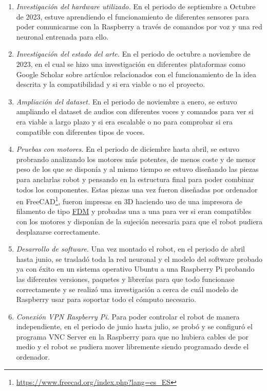 \begin{enumerate}
 \item \textit{Investigación del hardware utilizado.} En el periodo de septiembre a Octubre de 2023, estuve aprendiendo el funcionamiento de diferentes sensores para poder comunicarme con la Raspberry a través de comandos por voz y una red neuronal entrenada para ello.

 \item \textit{Investigación del estado del arte.} En el periodo de octubre a noviembre de 2023, en el cual se hizo una investigación en diferentes plataformas como Google Scholar sobre artículos relacionados con el funcionamiento de la idea descrita y la compatibilidad y si era viable o no el proyecto.
 
  \item \textit{Ampliación del dataset.} En el periodo de noviembre a enero, se estuvo ampliando el dataset de audios con diferentes voces y comandos para ver si era viable a largo plazo y si era escalable o no para comprobar si era compatible con diferentes tipos de voces.
  
  \item \textit{Pruebas con motores.} En el periodo de diciembre hasta abril, se estuvo probrando analizando los motores más potentes, de menos coste y de menor peso de los que se disponía y al mismo tiempo se estuvo diseñando las piezas para anclarlas robot y pensando en la estructura final para poder combinar todos los componentes. Estas piezas una vez fueron diseñadas por ordenador en FreeCAD\footnote{\url{https://www.freecad.org/index.php?lang=es_ES}}, fueron impresas en 3D haciendo uso de una impresora de filamento de tipo \hyperlink{FDM}{FDM} y probadas una a una para ver si eran compatibles con los motores y disponían de la sujeción necesaria para que el robot pudiera desplazarse correctamente.
  
 \item \textit{Desarrollo de software.} Una vez montado el robot, en el periodo de abril hasta junio, se trasladó toda la red neuronal y el modelo del software probado ya con éxito en un sistema operativo Ubuntu a una Raspberry Pi probando las diferentes versiones, paquetes y librerías para que todo funcionase correctamente y se realizó una investigación a cerca de cuál modelo de Raspberry usar para soportar todo el cómputo necesario.
 
  \item \textit{Conexión VPN Raspberry Pi.} Para poder controlar el robot de manera independiente, en el periodo de junio hasta julio, se probó y se configuró el programa VNC Server en la Raspberry para que no hubiera cables de por medio y el robot se pudiera mover libremente siendo programado desde el ordenador.
  

\end{enumerate}
